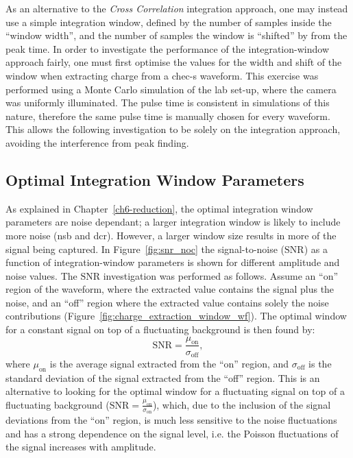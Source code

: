 As an alternative to the \textit{Cross Correlation} integration approach, one may instead use a simple integration window, defined by the number of samples inside the ``window width'', and the number of samples the window is ``shifted'' by from the peak time. In order to investigate the performance of the integration-window approach fairly, one must first optimise the values for the width and shift of the window when extracting charge from a \gls{chec-s} waveform. This exercise was performed using a Monte Carlo simulation of the lab set-up, where the camera was uniformly illuminated. The pulse time is consistent in simulations of this nature, therefore the same pulse time is manually chosen for every waveform. This allows the following investigation to be solely on the integration approach, avoiding the interference from peak finding.

\subsection{Optimal Integration Window Parameters}

As explained in Chapter~\ref{ch6-reduction}, the optimal integration window parameters are noise dependant; a larger integration window is likely to include more noise (\gls{nsb} and \gls{dcr}). However, a larger window size results in more of the signal being captured. In Figure~\ref{fig:snr_noc} the signal-to-noise ($\text{SNR}$) as a function of integration-window parameters is shown for different amplitude and noise values. The $\text{SNR}$ investigation was performed as follows. Assume an ``on'' region of the waveform, where the extracted value contains the signal plus the noise, and an ``off'' region where the extracted value contains solely the noise contributions (Figure~\ref{fig:charge_extraction_window_wf}). The optimal window for a constant signal on top of a fluctuating background is then found by:
\begin{equation}
\text{SNR} = \frac{\mu_\text{on}}{\sigma_\text{off}},
\end{equation}
where $\mu_\text{on}$ is the average signal extracted from the ``on'' region, and $\sigma_\text{off}$ is the standard deviation of the signal extracted from the ``off'' region. This is an alternative to looking for the optimal window for a fluctuating signal on top of a fluctuating background ($\text{SNR} = \frac{\mu_\text{on}}{\sigma_\text{on}}$), which, due to the inclusion of the signal deviations from the ``on'' region, is much less sensitive to the noise fluctuations and has a strong dependence on the signal level, i.e. the Poisson fluctuations of the signal increases with amplitude.

